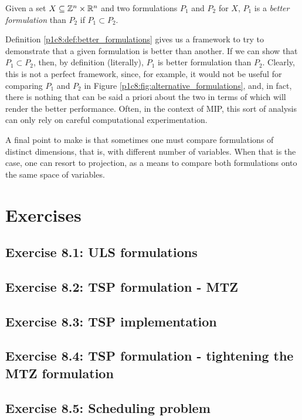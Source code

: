 \begin{definition} \label{p1c8:def:better_formulations}
  Given a set $X\subseteq \mathbb{Z}^n\times\mathbb{R}^n$ and two formulations $P_1$ and $P_2$ for $X$, $P_1$ is a \emph{better formulation} than $P_2$ if $P_1 \subset P_2$. 
\end{definition}

Definition \ref{p1c8:def:better_formulations} gives us a framework to try to demonstrate that a given formulation is better than another. If we can show that $P_1 \subset P_2$, then, by definition (literally), $P_1$ is better formulation than $P_2$. Clearly, this is not a perfect framework, since, for example, it would not be useful for comparing $P_1$ and $P_2$ in Figure \ref{p1c8:fig:alternative_formulations}, and, in fact, there is nothing that can be said a priori about the two in terms of which will render the better performance. Often, in the context of MIP, this sort of analysis can only rely on careful computational experimentation. 

A final point to make is that sometimes one must compare formulations of distinct dimensions, that is, with different number of variables. When that is the case, one can resort to projection, as a means to compare both formulations onto the same space of variables. 

\section{Exercises}

\subsection*{Exercise 8.1: ULS formulations}


\subsection*{Exercise 8.2: TSP formulation - MTZ}


\subsection*{Exercise 8.3: TSP implementation}


\subsection*{Exercise 8.4: TSP formulation - tightening the MTZ formulation}


\subsection*{Exercise 8.5: Scheduling problem}


